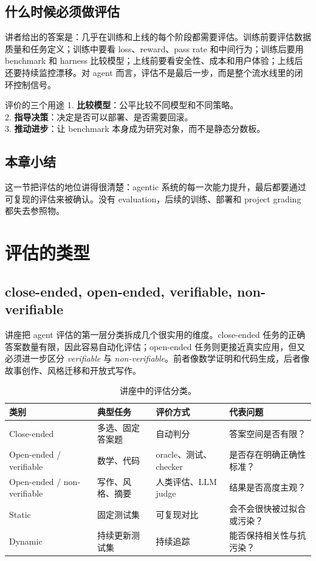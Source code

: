 \documentclass[a4paper]{article}
\begin{document}
\subsection{什么时候必须做评估}
讲者给出的答案是：几乎在训练和上线的每个阶段都需要评估。训练前要评估数据质量和任务定义；训练中要看 loss、reward、pass rate 和中间行为；训练后要用 benchmark 和 harness 比较模型；上线前要看安全性、成本和用户体验；上线后还要持续监控漂移。对 agent 而言，评估不是最后一步，而是整个流水线里的闭环控制信号。

\begin{importantbox}{评价的三个用途}
1. \textbf{比较模型}：公平比较不同模型和不同策略。\\
2. \textbf{指导决策}：决定是否可以部署、是否需要回滚。\\
3. \textbf{推动进步}：让 benchmark 本身成为研究对象，而不是静态分数板。
\end{importantbox}

\subsection{本章小结}
这一节把评估的地位讲得很清楚：agentic 系统的每一次能力提升，最后都要通过可复现的评估来被确认。没有 evaluation，后续的训练、部署和 project grading 都失去参照物。

\section{评估的类型}
\subsection{close-ended, open-ended, verifiable, non-verifiable}
讲座把 agent 评估的第一层分类拆成几个很实用的维度。close-ended 任务的正确答案数量有限，因此容易自动化评估；open-ended 任务则更接近真实应用，但又必须进一步区分 \emph{verifiable} 与 \emph{non-verifiable}。前者像数学证明和代码生成，后者像故事创作、风格迁移和开放式写作。

\begin{table}[H]
\centering
\small
\begin{tabular}{@{}p{}p{}p{}p{}@{}}
\toprule
类别 & 典型任务 & 评价方式 & 代表问题 \\
\midrule
Close-ended & 多选、固定答案题 & 自动判分 & 答案空间是否有限？ \\
Open-ended / verifiable & 数学、代码 & oracle、测试、checker & 是否存在明确正确性标准？ \\
Open-ended / non-verifiable & 写作、风格、摘要 & 人类评估、LLM judge & 结果是否高度主观？ \\
Static & 固定测试集 & 可复现对比 & 会不会很快被过拟合或污染？ \\
Dynamic & 持续更新测试集 & 持续追踪 & 能否保持相关性与抗污染？ \\
\bottomrule
\end{tabular}
\caption{讲座中的评估分类。}
\end{table}
\end{document}
